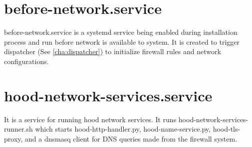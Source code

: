 \documentclass[mscthesis]{usiinfthesis}
\begin{document}
\section{before-network.service}\label{sec:before-network-service}
before-network.service is a systemd service being enabled during installation process and run before network is available to system. It is created to trigger dispatcher (See \cref{cha:dispatcher}) to initialize firewall rules and network configurations.

\section{hood-network-services.service}\label{sec:hood-network-services.service}
It is a service for running hood network services. It runs hood-network-services-runner.sh which starts hood-http-handler.py, hood-name-service.py, hood-tls-proxy, and a dnsmasq client for DNS queries made from the firewall system.
\end{document}
